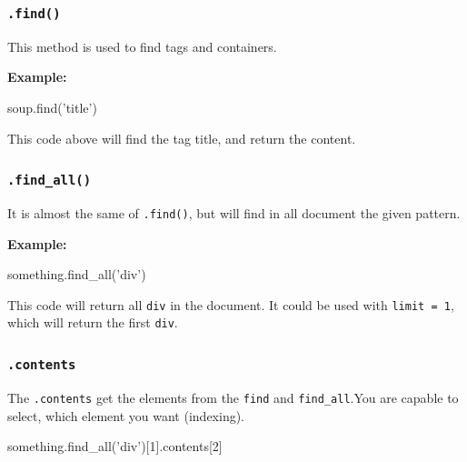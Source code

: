 \documentclass[]{book}
\newenvironment{Shaded}{\begin{snugshade}}{\end{snugshade}}
\newcommand{\DecValTok}[1]{\textcolor[rgb]{0.00,0.00,0.81}{#1}}
\newcommand{\StringTok}[1]{\textcolor[rgb]{0.31,0.60,0.02}{#1}}
\newcommand{\NormalTok}[1]{#1}
\begin{document}
\subsubsection{\texorpdfstring{\texttt{.find()}}{.find()}}\label{find}

This method is used to find tags and containers.

\textbf{Example:}

\begin{Shaded}
\begin{Highlighting}[]
\NormalTok{soup.find(}\StringTok{'title'}\NormalTok{)}
\end{Highlighting}
\end{Shaded}

This code above will find the tag title, and return the content.

\subsubsection{\texorpdfstring{\texttt{.find\_all()}}{.find\_all()}}\label{find_all}

It is almost the same of \texttt{.find()}, but will find in all document
the given pattern.

\textbf{Example:}

\begin{Shaded}
\begin{Highlighting}[]
\NormalTok{something.find_all(}\StringTok{'div'}\NormalTok{)}
\end{Highlighting}
\end{Shaded}

This code will return all \texttt{div} in the document. It could be used
with \texttt{limit\ =\ 1}, which will return the first \texttt{div}.

\subsubsection{\texorpdfstring{\texttt{.contents}}{.contents}}\label{contents}

The \texttt{.contents} get the elements from the \texttt{find} and
\texttt{find\_all}.You are capable to select, which element you want
(indexing).

\begin{Shaded}
\begin{Highlighting}[]
\NormalTok{something.find_all(}\StringTok{'div'}\NormalTok{)[}\DecValTok{1}\NormalTok{].contents[}\DecValTok{2}\NormalTok{]}
\end{Highlighting}
\end{Shaded}
\end{document}
